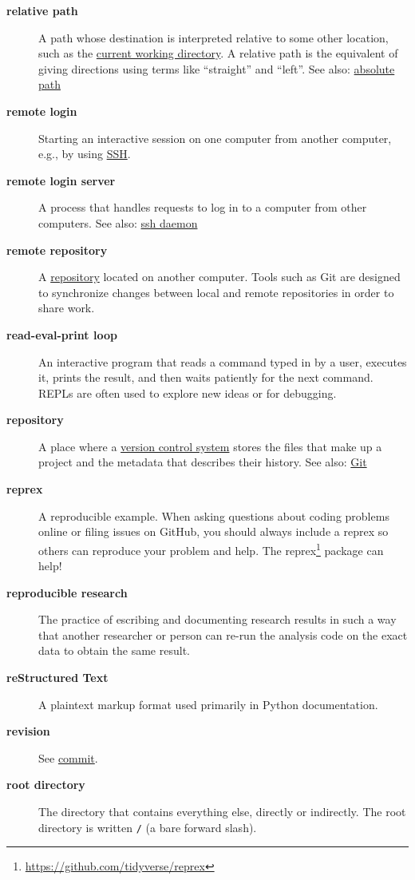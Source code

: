 \documentclass[
]{krantz}
\renewcommand{\href}[2]{#2\footnote{\url{#1}}}
\begin{document}
\begin{description}
\item[\textbf{relative path}]
A path whose destination is interpreted relative to some other location, such as the \protect\hyperlink{current_working_directory}{current working directory}. A relative path is the equivalent of giving directions using terms like ``straight'' and ``left''. See also: \protect\hyperlink{absolute_path}{absolute path}
\item[\textbf{remote login}]
Starting an interactive session on one computer from another computer, e.g., by using \protect\hyperlink{ssh}{SSH}.
\item[\textbf{remote login server}]
A process that handles requests to log in to a computer from other computers. See also: \protect\hyperlink{ssh_daemon}{ssh daemon}
\item[\textbf{remote repository}]
A \protect\hyperlink{repository}{repository} located on another computer. Tools such as Git are designed to synchronize changes between local and remote repositories in order to share work.
\item[\textbf{read-eval-print loop}]
An interactive program that reads a command typed in by a user, executes it, prints the result, and then waits patiently for the next command. REPLs are often used to explore new ideas or for debugging.
\item[\textbf{repository}]
A place where a \protect\hyperlink{version_control_system}{version control system} stores the files that make up a project and the metadata that describes their history. See also: \protect\hyperlink{git}{Git}
\item[\textbf{reprex}]
A reproducible example. When asking questions about coding problems online or filing issues on GitHub, you should always include a reprex so others can reproduce your problem and help. The \href{https://github.com/tidyverse/reprex}{reprex} package can help!
\item[\textbf{reproducible research}]
The practice of escribing and documenting research results in such a way that another researcher or person can re-run the analysis code on the exact data to obtain the same result.
\item[\textbf{reStructured Text}]
A plaintext markup format used primarily in Python documentation.
\item[\textbf{revision}]
See \protect\hyperlink{commit}{commit}.
\item[\textbf{root directory}]
The directory that contains everything else, directly or indirectly. The root directory is written \texttt{/} (a bare forward slash).

\end{description}
\end{document}
